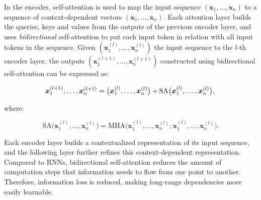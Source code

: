 In the encoder, self-attention is used to map the input sequence $(\bm{x}_1, \ldots, \bm{x}_n)$ to a sequence of context-dependent vectors $(\overline{\bm{x}}_1, \ldots, \overline{\bm{x}}_n)$. Each attention layer builds the queries, keys and values from the outputs of the previous encoder layer, and uses \textit{bidirectional} self-attention to put each input token in relation with all input tokens in the sequence. Given $(\bm{x}^{(l)}_1, \ldots, \bm{x}^{(l)}_n)$ the input sequence to the $l$-th encoder layer, the outputs $(\bm{x}^{(l+1)}_1, \ldots, \bm{x}^{(l+1)}_n)$ constructed using bidirectional self-attention can be expressed as:

\begin{equation}
    \bm{x}^{(l+1)}_1, \ldots, \bm{x}^{(l+1)}_n = \bigl(\bm{x}^{(l)}_1, \ldots, \bm{x}^{(l)}_n\bigr) + \textrm{SA}\bigl(\bm{x}^{(l)}_1, \ldots, \bm{x}^{(l)}_n\bigr), \\
\end{equation}

\noindent where:

\begin{equation}
    \textrm{SA}\bigl(\bm{x}^{(l)}_1, \ldots, \bm{x}^{(l)}_n\bigr) = \textrm{MHA}\bigl(\bm{x}^{(l)}_1, \ldots, \bm{x}^{(l)}_n ; \bm{x}^{(l)}_1, \ldots, \bm{x}^{(l)}_n\bigr).
\end{equation}


Each encoder layer builds a contextualized representation of its input sequence, and the following layer further refines this context-dependent representation. Compared to \acp{RNN}, bidirectional self-attention reduces the amount of computation steps that information needs to flow from one point to another. Therefore, information loss is reduced, making long-range dependencies more easily learnable. 

